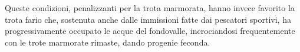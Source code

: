 \documentclass[10pt,twoside,openany,x11names,svgnames,italian,a5paper,dvipsnames,table]{memoir}
\begin{document}
Queste condizioni, penalizzanti per la trota marmorata, hanno invece favorito la trota fario che, sostenuta anche dalle immissioni fatte dai pescatori sportivi, ha progressivamente occupato le acque del fondovalle, incrociandosi frequentemente con le trote marmorate rimaste, dando progenie feconda.


\begin{comment}
\section{Avifauna ittiofaga}
In seguito alle misure di protezione attuate a livello nazionale e europeo, la presenza di avifauna ittiofaga in provincia di Trento ha conosciuto recentemente incrementi notevoli. Oltre all’aumentata presenza dell’airone cenerino \emph{Ardea cinerea} - dai pochissimi esemplari degli anni ‘90 agli attuali 400-450 presenti tutto l’anno prevalentemente lungo i ruscelli - ha destato preoccupazione l’incremento del cormorano \emph{Phalacrocorax carbo}. Questo ittiofago specializzato, svernante in provincia di Trento, presente solo sporadicamente prima del 1994 ma aumentato in quantità senza precedenti a memoria d’uomo in seguito all’entrata in vigore della normativa europea che tutela la specie, ha avuto un impatto evidente sull’ittiofauna.

La popolazione di cormorano svernante nel Trentino - regolarmente monitorata del Servizio Foreste e fauna nei principali dormitori, lungo le direttrici di dispersione e nelle zone di alimentazione - è cresciuta dagli 8 individui del 1994 fino agli attuali 400 \cite{Pedrini05}. I rilevamenti hanno evidenziato la sempre maggiore penetrazione del cormorano nelle valli interne della provincia, con i siti di alimentazione che oggi durante i mesi di novembre e dicembre, impegnati nella riproduzione e raccolti sulle aree di frega, gli esemplari di trota marmorata diventano vulnerabili e facilmente predabili.

I monitoraggi ittici condotti dal Servizio Foreste e fauna in collaborazione con la Fondazione Mach hanno evidenziato, contemporaneamente all’aumento dei cormorani, la contrazione numerica della trota marmorata. La predazione rappresenta un problema per la pesca: in seguito all’affermarsi dei cormorani si rileva un calo del pescato di trota marmorata che supera, in alcune zone, l’80\%.

Sentito l’Istituto Nazionale per la Fauna Selvatica (ora \href{http://www.isprambiente.gov.it/it}{ISPRA}, Istituto Superiore per la Protezione e la Ricerca Ambientale), al fine di limitare l’attività predatoria del cormorano sulla trota marmorata sono state attivate, a partire dalla stagione 2008-2009, apposite forme di controllo. 
\end{comment}
\end{document}
